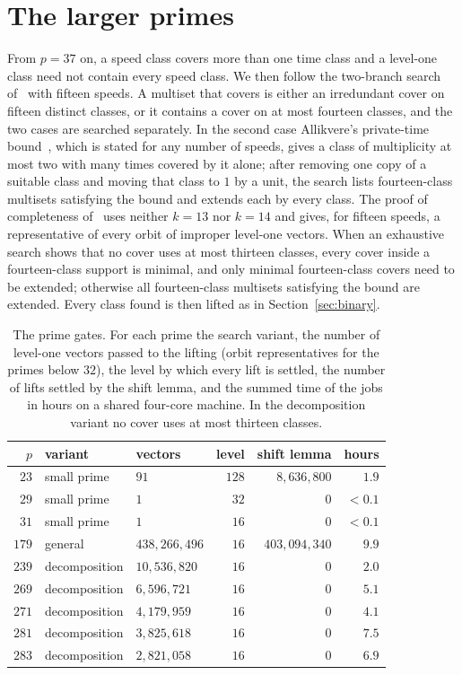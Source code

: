 \documentclass[aps,prd,twocolumn,superscriptaddress,nofootinbib,longbibliography,floatfix,showkeys,amsmath,amssymb,10pt]{revtex4-2}
\theoremstyle{definition}
\theoremstyle{remark}
\newenvironment{wtable}{\begin{table}[t]}{\end{table}}
\begin{document}
\section{The larger primes}\label{sec:large}

From $p=37$ on, a speed class covers more than one time class and a
level-one class need not contain every speed class. We then follow the
two-branch search of~\cite[Sect.~4.1]{All26} with fifteen speeds. A
multiset that covers is either an irredundant cover on fifteen distinct
classes, or it contains a cover on at most fourteen classes, and the two
cases are searched separately. In the second case Allikvere's private-time
bound~\cite[Lemma~4.1]{All26}, which is stated for any number of speeds,
gives a class of multiplicity at most two with many times covered by it
alone; after removing one copy of a suitable class and moving that class to
$1$ by a unit, the search lists fourteen-class multisets satisfying the bound
and extends each by every class. The proof of completeness
of~\cite[Proposition~4.2]{All26} uses neither $k=13$ nor $k=14$ and gives,
for fifteen speeds, a representative of every orbit of improper level-one
vectors. When an exhaustive search shows that no cover uses at most thirteen
classes, every cover inside a fourteen-class support is minimal, and only
minimal fourteen-class covers need to be extended; otherwise all
fourteen-class multisets satisfying the bound are extended. Every class
found is then lifted as in Section~\ref{sec:binary}.

\begin{wtable}
\caption{The prime gates. For each prime the search variant, the number of
level-one vectors passed to the lifting (orbit representatives for the
primes below $32$), the level by which every lift is settled, the number of
lifts settled by the shift lemma, and the summed time of the jobs in hours
on a shared four-core machine. In the decomposition variant no cover uses
at most thirteen classes.}
\label{tab:results}
\centering
\small
\begin{tabular}{@{}rllrrr@{}}
\toprule
$p$ & variant & vectors & level & shift lemma & hours\\
\midrule
$23$ & small prime & $91$ & $128$ & $8{,}636{,}800$ & $1.9$\\
$29$ & small prime & $1$ & $32$ & $0$ & $<0.1$\\
$31$ & small prime & $1$ & $16$ & $0$ & $<0.1$\\
$179$ & general & $438{,}266{,}496$ & $16$ & $403{,}094{,}340$ & $9.9$\\
$239$ & decomposition & $10{,}536{,}820$ & $16$ & $0$ & $2.0$\\
$269$ & decomposition & $6{,}596{,}721$ & $16$ & $0$ & $5.1$\\
$271$ & decomposition & $4{,}179{,}959$ & $16$ & $0$ & $4.1$\\
$281$ & decomposition & $3{,}825{,}618$ & $16$ & $0$ & $7.5$\\
$283$ & decomposition & $2{,}821{,}058$ & $16$ & $0$ & $6.9$\\
\bottomrule
\end{tabular}
\end{wtable}
\end{document}
